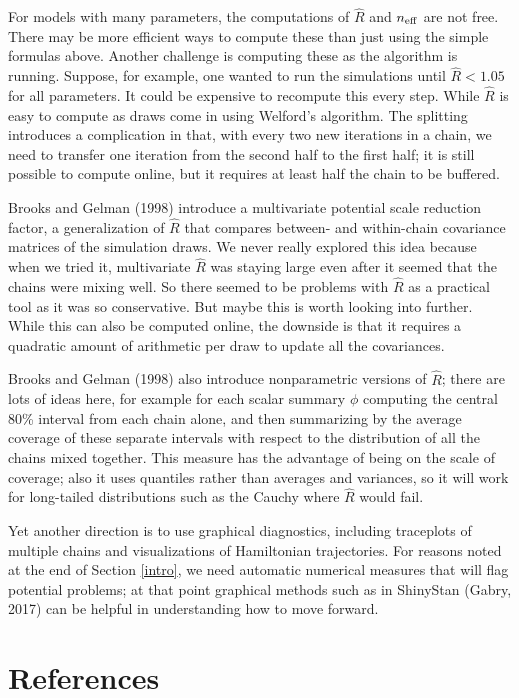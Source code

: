 \documentclass[11pt]{article}
\begin{document}
For models with many parameters, the computations of $\widehat{R}$ and $n_{\rm eff}$ are not free.  There may be more efficient ways to compute these than just using the simple formulas above.  Another challenge is computing these as the algorithm is running.  Suppose, for example, one wanted to run the simulations until $\widehat{R}<1.05$ for all parameters.  It could be expensive to recompute this every step.  While $\widehat{R}$ is easy to compute as draws come in using Welford's algorithm.  The splitting introduces a complication in that, with every two new iterations in a chain, we need to transfer one iteration from the second half to the first half;  it is still possible to compute online, but it requires at least half the chain to be buffered.

Brooks and Gelman (1998) introduce a multivariate potential scale reduction factor, a generalization of $\widehat{R}$ that compares between- and within-chain covariance matrices of the simulation draws.  We never really explored this idea because when we tried it, multivariate $\widehat{R}$ was staying large even after it seemed that the chains were mixing well.  So there seemed to be problems with $\widehat{R}$ as a practical tool as it was so conservative.  But maybe this is worth looking into further.  While this can also be computed online, the downside is that it requires a quadratic amount of arithmetic per draw to update all the covariances.

Brooks and Gelman (1998) also introduce nonparametric versions of $\widehat{R}$; there are lots of ideas here, for example for each scalar summary $\phi$ computing the central 80\% interval from each chain alone, and then summarizing by the average coverage of these separate intervals with respect to the distribution of all the chains mixed together.  This measure has the advantage of being on the scale of coverage; also it uses quantiles rather than averages and variances, so it will work for long-tailed distributions such as the Cauchy where $\widehat{R}$ would fail.

Yet another direction is to use graphical diagnostics, including traceplots of multiple chains and visualizations of Hamiltonian trajectories.  For reasons noted at the end of Section \ref{intro}, we need automatic numerical measures that will flag potential problems; at that point graphical methods such as in ShinyStan (Gabry, 2017) can be helpful in understanding how to move forward.

\section*{References}
\end{document}
